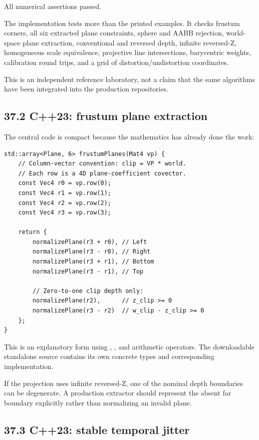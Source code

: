 All numerical assertions passed.

The implementation tests more than the printed examples. It checks frustum corners, all six extracted plane constraints, sphere and AABB rejection, world-space plane extraction, conventional and reversed depth, infinite reversed-Z, homogeneous scale equivalence, projective line intersections, barycentric weights, calibration round trips, and a grid of distortion/undistortion coordinates.

This is an independent reference laboratory, not a claim that the same algorithms have been integrated into the production repositories.

\subsection{37.2 C++23: frustum plane extraction}\label{02-foundations-ii-ch037-c23-frustum-plane-extraction}

\hypertarget{02-foundations-ii-ch037-c23-frustum-plane-extraction}{}

The central code is compact because the mathematics has already done the work:

\begin{verbatim}
std::array<Plane, 6> frustumPlanes(Mat4 vp) {
    // Column-vector convention: clip = VP * world.
    // Each row is a 4D plane-coefficient covector.
    const Vec4 r0 = vp.row(0);
    const Vec4 r1 = vp.row(1);
    const Vec4 r2 = vp.row(2);
    const Vec4 r3 = vp.row(3);

    return {
        normalizePlane(r3 + r0), // Left
        normalizePlane(r3 - r0), // Right
        normalizePlane(r3 + r1), // Bottom
        normalizePlane(r3 - r1), // Top

        // Zero-to-one clip depth only:
        normalizePlane(r2),      // z_clip >= 0
        normalizePlane(r3 - r2)  // w_clip - z_clip >= 0
    };
}
\end{verbatim}

This is an explanatory form using , , and arithmetic operators. The downloadable standalone source contains its own concrete types and corresponding implementation.

If the projection uses infinite reversed-Z, one of the nominal depth boundaries can be degenerate. A production extractor should represent the absent far boundary explicitly rather than normalizing an invalid plane.

\subsection{37.3 C++23: stable temporal jitter}\label{02-foundations-ii-ch037-c23-stable-temporal-jitter}


